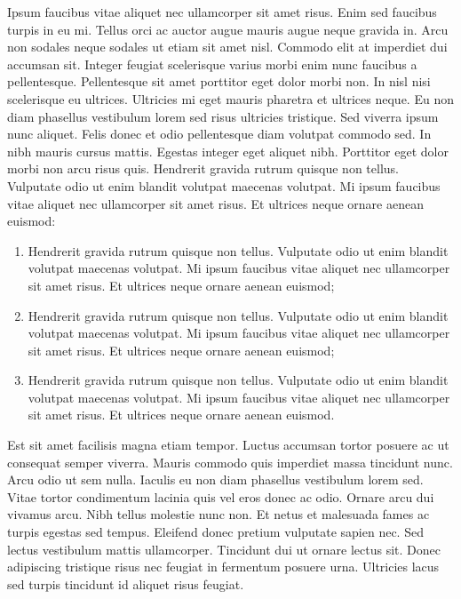 \documentclass[12pt]{article}
\begin{document}
\par Ipsum faucibus vitae aliquet nec ullamcorper sit amet risus. Enim sed faucibus turpis in eu mi. Tellus orci ac auctor augue mauris augue neque gravida in. Arcu non sodales neque sodales ut etiam sit amet nisl. Commodo elit at imperdiet dui accumsan sit. Integer feugiat scelerisque varius morbi enim nunc faucibus a pellentesque. Pellentesque sit amet porttitor eget dolor morbi non. In nisl nisi scelerisque eu ultrices. Ultricies mi eget mauris pharetra et ultrices neque. Eu non diam phasellus vestibulum lorem sed risus ultricies tristique. Sed viverra ipsum nunc aliquet. Felis donec et odio pellentesque diam volutpat commodo sed. In nibh mauris cursus mattis. Egestas integer eget aliquet nibh. Porttitor eget dolor morbi non arcu risus quis. Hendrerit gravida rutrum quisque non tellus. Vulputate odio ut enim blandit volutpat maecenas volutpat. Mi ipsum faucibus vitae aliquet nec ullamcorper sit amet risus. Et ultrices neque ornare aenean euismod:
\begin{enumerate}
  \item Hendrerit gravida rutrum quisque non tellus. Vulputate odio ut enim blandit volutpat maecenas volutpat. Mi ipsum faucibus vitae aliquet nec ullamcorper sit amet risus. Et ultrices neque ornare aenean euismod;
  \item Hendrerit gravida rutrum quisque non tellus. Vulputate odio ut enim blandit volutpat maecenas volutpat. Mi ipsum faucibus vitae aliquet nec ullamcorper sit amet risus. Et ultrices neque ornare aenean euismod;
  \item Hendrerit gravida rutrum quisque non tellus. Vulputate odio ut enim blandit volutpat maecenas volutpat. Mi ipsum faucibus vitae aliquet nec ullamcorper sit amet risus. Et ultrices neque ornare aenean euismod.
\end{enumerate}

\par Est sit amet facilisis magna etiam tempor. Luctus accumsan tortor posuere ac ut consequat semper viverra. Mauris commodo quis imperdiet massa tincidunt nunc. Arcu odio ut sem nulla. Iaculis eu non diam phasellus vestibulum lorem sed. Vitae tortor condimentum lacinia quis vel eros donec ac odio. Ornare arcu dui vivamus arcu. Nibh tellus molestie nunc non. Et netus et malesuada fames ac turpis egestas sed tempus. Eleifend donec pretium vulputate sapien nec. Sed lectus vestibulum mattis ullamcorper. Tincidunt dui ut ornare lectus sit. Donec adipiscing tristique risus nec feugiat in fermentum posuere urna. Ultricies lacus sed turpis tincidunt id aliquet risus feugiat. 
\end{document}
